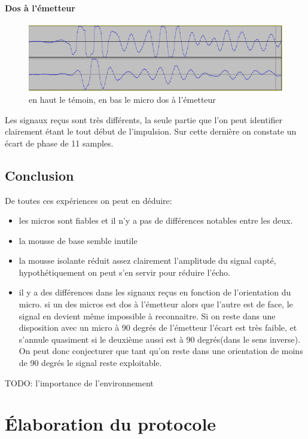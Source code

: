 \documentclass[12pt,a4paper]{report}
\begin{document}
\subsubsection{Dos à l'émetteur}
\begin{figure}[H]
\includegraphics[width=\textwidth]{img/dos_a_la_source.png}
\caption{en haut le témoin, en bas le micro dos à l'émetteur}
\end{figure}
Les signaux reçus sont très différents, la seule partie que l'on peut identifier clairement étant le tout début de l'impulsion. Sur cette dernière on constate un écart de phase de 11 samples.

\section{Conclusion}
De toutes ces expériences on peut en déduire:
\begin{itemize}
\item les micros sont fiables et il n'y a pas de différences notables entre les deux.
\item la mousse de base semble inutile
\item la mousse isolante réduit assez clairement l'amplitude du signal capté, hypothétiquement on peut s'en servir pour réduire l'écho.
\item il y a des différences dans les signaux reçus en fonction de l'orientation du micro. si un des micros est dos à l'émetteur alors que l'autre est de face, le signal en devient même impossible à reconnaitre. Si on reste dans une disposition avec un micro à 90 degrés de l'émetteur l'écart est très faible, et s'annule quasiment si le deuxième aussi est à 90 degrés(dans le sens inverse). On peut donc conjecturer que tant qu'on reste dans une orientation de moins de 90 degrés le signal reste exploitable.
\end{itemize}

TODO: l'importance de l'environnement

\chapter{Élaboration du protocole}
\end{document}
